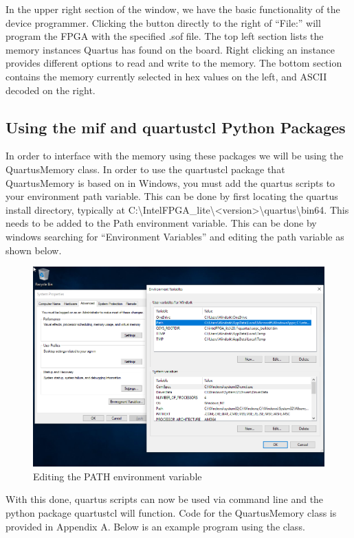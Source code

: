 \documentclass[letter,12pt]{article}
\begin{document}
In the upper right section of the window, we have the basic functionality of the device programmer. Clicking the button directly to the right of ``File:'' will program the FPGA with the specified .sof file. The top left section lists the memory instances Quartus has found on the board. Right clicking an instance provides different options to read and write to the memory. The bottom section contains the memory currently selected in hex values on the left, and ASCII decoded on the right.

\subsection{Using the mif and quartustcl Python Packages}

In order to interface with the memory using these packages we will be using the QuartusMemory class. In order to use the quartustcl package that QuartusMemory is based on in Windows, you must add the quartus scripts to your environment path variable. This can be done by first locating the quartus install directory, typically at C:\textbackslash IntelFPGA\_lite\textbackslash\textless version\textgreater\textbackslash quartus\textbackslash bin64. This needs to be added to the Path environment variable. This can be done by windows searching for ``Environment Variables'' and editing the path variable as shown below.

\begin{figure}[H]
  \centering
  \includegraphics[width=\linewidth]{pics/EnvironmentVariables.png}
  \caption{Editing the PATH environment variable}
\end{figure}

With this done, quartus scripts can now be used via command line and the python package quartustcl will function. Code for the QuartusMemory class is provided in Appendix A. Below is an example program using the class.
\end{document}
